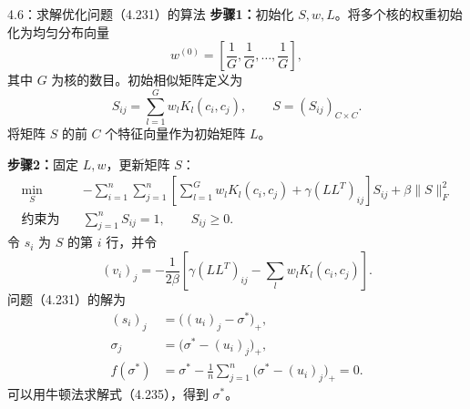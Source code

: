 \begin{bookalgorithm}{4.6：求解优化问题（4.231）的算法}
\textbf{步骤1：}初始化 $S,w,L$。将多个核的权重初始化为均匀分布向量
\[
w^{(0)}=\left[\frac1G,\frac1G,\ldots,\frac1G\right],
\]
其中 $G$ 为核的数目。初始相似矩阵定义为
\[
S_{ij}=\sum_{l=1}^{G}w_lK_l(c_i,c_j),\qquad S=(S_{ij})_{C\times C}.
\]
将矩阵 $S$ 的前 $C$ 个特征向量作为初始矩阵 $L$。

\textbf{步骤2：}固定 $L,w$，更新矩阵 $S$：
\begin{equation}
\begin{aligned}
\min_S\quad
 &-\sum_{i=1}^{n}\sum_{j=1}^{n}
 \left[\sum_{l=1}^{G}w_lK_l(c_i,c_j)+\gamma(LL^T)_{ij}\right]S_{ij}
 +\beta\|S\|_F^2\\
\text{约束为}\quad&\sum_{j=1}^{n}S_{ij}=1,\qquad S_{ij}\ge0.
\end{aligned}\tag{4.234}
\end{equation}
令 $s_i$ 为 $S$ 的第 $i$ 行，并令
\[
(v_i)_j=-\frac{1}{2\beta}
\left[\gamma(LL^T)_{ij}-\sum_lw_lK_l(c_i,c_j)\right].
\]
问题（4.231）的解为
\begin{equation}
\begin{aligned}
(s_i)_j&=\bigl((u_i)_j-\sigma^*\bigr)_+,\\
\sigma_j&=\bigl(\sigma^*-(u_i)_j\bigr)_+,\\
f(\sigma^*)&=\sigma^*-\frac1n\sum_{j=1}^{n}
 \bigl(\sigma^*-(u_i)_j\bigr)_+=0.
\end{aligned}\tag{4.235}
\end{equation}
可以用牛顿法求解式（4.235），得到 $\sigma^*$。


\end{bookalgorithm}
